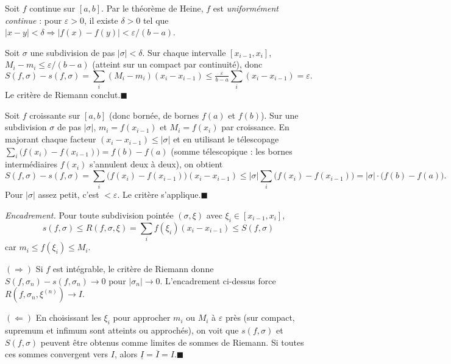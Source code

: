 \begin{mdframed}[style=proofbar]
  Soit $f$ continue sur $[a,b]$. Par le théorème de Heine, $f$ est
  \emph{uniformément continue} : pour $\varepsilon>0$, il existe $\delta>0$
  tel que $|x-y| < \delta \Rightarrow |f(x)-f(y)| < \varepsilon/(b-a)$.

  \medskip
  Soit $\sigma$ une subdivision de pas $|\sigma| < \delta$. Sur chaque
  intervalle $[x_{i-1},x_i]$, $M_i - m_i \leq \varepsilon/(b-a)$ (atteint sur
  un compact par continuité), donc
  \[
    S(f,\sigma) - s(f,\sigma) = \sum_i (M_i - m_i)(x_i - x_{i-1})
    \leq \tfrac{\varepsilon}{b-a}\sum_i (x_i - x_{i-1}) = \varepsilon.
  \]
  Le critère de Riemann conclut.\hfill$\blacksquare$
\end{mdframed}


\begin{mdframed}[style=proofbar]
  Soit $f$ croissante sur $[a,b]$ (donc bornée, de bornes $f(a)$ et $f(b)$).
  Sur une subdivision $\sigma$ de pas $|\sigma|$, $m_i = f(x_{i-1})$ et
  $M_i = f(x_i)$ par croissance. En majorant chaque facteur
  $(x_i - x_{i-1}) \leq |\sigma|$ et en utilisant le télescopage
  $\sum_i \bigl(f(x_i) - f(x_{i-1})\bigr) = f(b) - f(a)$ (somme télescopique :
  les bornes intermédiaires $f(x_i)$ s'annulent deux à deux), on obtient
  \[
    S(f,\sigma) - s(f,\sigma) = \sum_i \bigl(f(x_i) - f(x_{i-1})\bigr)(x_i - x_{i-1})
    \leq |\sigma|\sum_i \bigl(f(x_i) - f(x_{i-1})\bigr) = |\sigma|\cdot\bigl(f(b) - f(a)\bigr).
  \]
  Pour $|\sigma|$ assez petit, c'est $< \varepsilon$. Le critère
  s'applique.\hfill$\blacksquare$
\end{mdframed}


\begin{mdframed}[style=proofbar]
  \textit{Encadrement.}\enspace%
  Pour toute subdivision pointée $(\sigma, \xi)$ avec
  $\xi_i\in[x_{i-1},x_i]$,
  \[
    s(f,\sigma) \leq R(f,\sigma,\xi) = \sum_i f(\xi_i)(x_i - x_{i-1}) \leq S(f,\sigma)
  \]
  car $m_i \leq f(\xi_i) \leq M_i$.

  \medskip
  \textit{$(\Rightarrow)$}\enspace%
  Si $f$ est intégrable, le critère de Riemann donne
  $S(f,\sigma_n)-s(f,\sigma_n)\to 0$ pour $|\sigma_n|\to 0$. L'encadrement
  ci-dessus force $R(f,\sigma_n,\xi^{(n)})\to I$.

  \medskip
  \textit{$(\Leftarrow)$}\enspace%
  En choisissant les $\xi_i$ pour approcher $m_i$ ou $M_i$ à $\varepsilon$
  près (sur compact, supremum et infimum sont atteints ou approchés), on
  voit que $s(f,\sigma)$ et $S(f,\sigma)$ peuvent être obtenus comme
  limites de sommes de Riemann. Si toutes ces sommes convergent vers
  $I$, alors $\underline{I} = \overline{I} = I$.\hfill$\blacksquare$
\end{mdframed}

